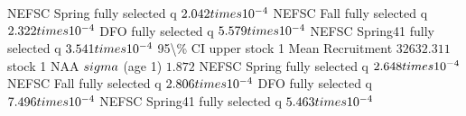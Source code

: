 \documentclass[
]{article}
\begin{document}
NEFSC Spring fully selected q \(2.042\\times 10^{-4}\) NEFSC Fall fully
selected q \(2.322\\times 10^{-4}\) DFO fully selected q
\(5.579\\times 10^{-4}\) NEFSC Spring41 fully selected q
\(3.541\\times 10^{-4}\) 95\textbackslash\% CI upper stock 1 Mean
Recruitment \(32632.311\) stock 1 NAA \(\\sigma\) (age 1) \(1.872\)
NEFSC Spring fully selected q \(2.648\\times 10^{-4}\) NEFSC Fall fully
selected q \(2.806\\times 10^{-4}\) DFO fully selected q
\(7.496\\times 10^{-4}\) NEFSC Spring41 fully selected q
\(5.463\\times 10^{-4}\)
\end{document}
